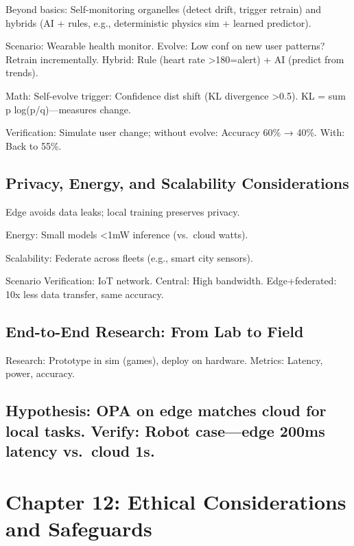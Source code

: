 \documentclass[
]{article}
\begin{document}
Beyond basics: Self-monitoring organelles (detect drift, trigger
retrain) and hybrids (AI + rules, e.g., deterministic physics sim +
learned predictor).

Scenario: Wearable health monitor. Evolve: Low conf on new user
patterns? Retrain incrementally. Hybrid: Rule (heart rate
\textgreater180=alert) + AI (predict from trends).

Math: Self-evolve trigger: Confidence dist shift (KL divergence
\textgreater0.5). KL = sum p log(p/q)---measures change.

Verification: Simulate user change; without evolve: Accuracy 60\% →
40\%. With: Back to 55\%.

\subsection{Privacy, Energy, and Scalability
Considerations}\label{privacy-energy-and-scalability-considerations}

Edge avoids data leaks; local training preserves privacy.

Energy: Small models \textless1mW inference (vs.~cloud watts).

Scalability: Federate across fleets (e.g., smart city sensors).

Scenario Verification: IoT network. Central: High bandwidth.
Edge+federated: 10x less data transfer, same accuracy.

\subsection{End-to-End Research: From Lab to
Field}\label{end-to-end-research-from-lab-to-field}

Research: Prototype in sim (games), deploy on hardware. Metrics:
Latency, power, accuracy.

\subsection{Hypothesis: OPA on edge matches cloud for local tasks.
Verify: Robot case---edge 200ms latency vs.~cloud
1s.}\label{hypothesis-opa-on-edge-matches-cloud-for-local-tasks.-verify-robot-caseedge-200ms-latency-vs.-cloud-1s.}

\section{Chapter 12: Ethical Considerations and
Safeguards}\label{chapter-12-ethical-considerations-and-safeguards}
\end{document}
